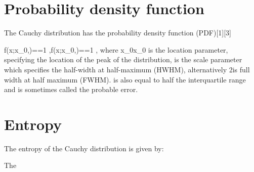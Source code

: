 
\section*{Probability density function}
The Cauchy distribution has the probability density function (PDF)[1][3]

{\displaystyle f(x;x_{0},\gamma )={}={1 \over \pi \gamma },}f(x;x_{0},\gamma )={}={1 \over \pi \gamma },
where {\displaystyle x_{0}}x_{0} is the location parameter, specifying the location of the peak of the distribution, 
 {\displaystyle \gamma }\gamma  is the scale parameter which specifies the half-width at half-maximum (HWHM), alternatively {\gamma }2\gamma  is full width at half maximum (FWHM). {\displaystyle \gamma }\gamma  is also equal to half the interquartile range and is sometimes called the probable error.

\section*{Entropy}
The entropy of the Cauchy distribution is given by:

{}{}
The